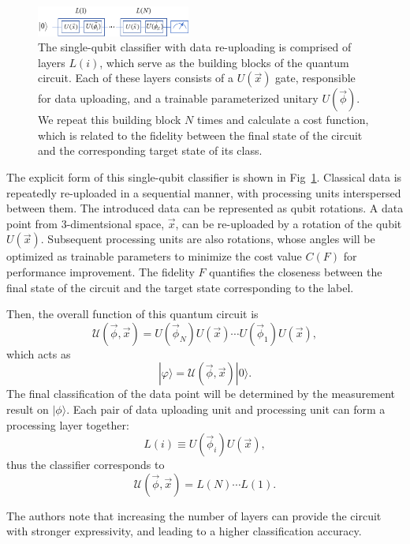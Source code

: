 \begin{figure}[H]
\centering
\includegraphics[width=0.45\textwidth]
{5.4.3_figures/data_reuploading_circuit.pdf}
\caption{The single-qubit classifier with data re-uploading is comprised of layers $L(i)$, which serve as the building blocks of the quantum circuit. Each of these layers consists of a $U(\overrightarrow{x})$ gate, responsible for data uploading, and a trainable parameterized unitary $U(\overrightarrow{\phi})$. We repeat this building block $N$ times and calculate a cost function, which is related to the fidelity between the final state of the circuit and the corresponding target state of its class.}
\label{data_reuploading_circuit}
\end{figure}

The explicit form of this single-qubit classifier is
shown in Fig~\ref{data_reuploading_circuit}. Classical data is repeatedly re-uploaded in a sequential manner, with processing units interspersed between them. The introduced data can be represented as qubit rotations.  A data point from 3-dimentsional space, $\overrightarrow{x}$, can be re-uploaded by a rotation of the qubit $U(\overrightarrow{x})$. Subsequent processing units are also rotations, whose angles will be optimized as trainable parameters to minimize the cost value $C(F)$ for performance improvement. The fidelity $F$ quantifies the closeness between the final state of the circuit and the target state corresponding to the label.

Then, the overall function of this quantum circuit is 
$$\mathcal{U}(\overrightarrow{\phi},\overrightarrow{x})=U(\overrightarrow{\phi}_N)U(\overrightarrow{x})\cdots U(\overrightarrow{\phi}_1)U(\overrightarrow{x}),$$
which acts as 
$$|\varphi\rangle=\mathcal{U}(\overrightarrow{\phi},\overrightarrow{x})|0\rangle.$$
The final classification of the data point will be determined by the measurement result on $|\phi\rangle$. Each pair of data uploading unit and processing unit can form a processing layer together:
$$L(i)\equiv U(\overrightarrow{\phi}_i)U(\overrightarrow{x}),$$
thus the classifier corresponds to 
$$\mathcal{U}(\overrightarrow{\phi},\overrightarrow{x})=L(N)\cdots L(1).$$

The authors note that increasing the number of layers can provide the circuit with stronger expressivity, and leading to a higher classification accuracy.

